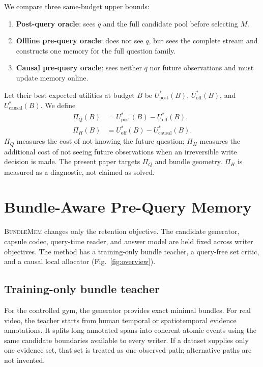 \documentclass[10pt,twocolumn,letterpaper]{article}
\newcommand{\method}{\textnormal{\textsc{BundleMem}}\xspace}
\begin{document}
We compare three same-budget upper bounds:
\begin{enumerate}[leftmargin=*,itemsep=1pt]
    \item \textbf{Post-query oracle}: sees $q$ and the full candidate pool before selecting $M$.
    \item \textbf{Offline pre-query oracle}: does not see $q$, but sees the complete stream and constructs one memory for the full question family.
    \item \textbf{Causal pre-query oracle}: sees neither $q$ nor future observations and must update memory online.
\end{enumerate}
Let their best expected utilities at budget $B$ be $U^*_{\mathrm{post}}(B)$, $U^*_{\mathrm{off}}(B)$, and $U^*_{\mathrm{causal}}(B)$.
We define
\begin{align}
    \Pi_Q(B)&=U^*_{\mathrm{post}}(B)-U^*_{\mathrm{off}}(B),\\
    \Pi_H(B)&=U^*_{\mathrm{off}}(B)-U^*_{\mathrm{causal}}(B).
    \label{eq:prices}
\end{align}
$\Pi_Q$ measures the cost of not knowing the future question; $\Pi_H$ measures the additional cost of not seeing future observations when an irreversible write decision is made.
The present paper targets $\Pi_Q$ and bundle geometry.
$\Pi_H$ is measured as a diagnostic, not claimed as solved.

\section{Bundle-Aware Pre-Query Memory}
\label{sec:method}

\method changes only the retention objective.
The candidate generator, capsule codec, query-time reader, and answer model are held fixed across writer objectives.
The method has a training-only bundle teacher, a query-free set critic, and a causal local allocator (Fig.~\ref{fig:overview}).

\subsection{Training-only bundle teacher}
\label{sec:teacher}

For the controlled gym, the generator provides exact minimal bundles.
For real video, the teacher starts from human temporal or spatiotemporal evidence annotations.
It splits long annotated spans into coherent atomic events using the same candidate boundaries available to every writer.
If a dataset supplies only one evidence set, that set is treated as one observed path; alternative paths are not invented.
\end{document}

